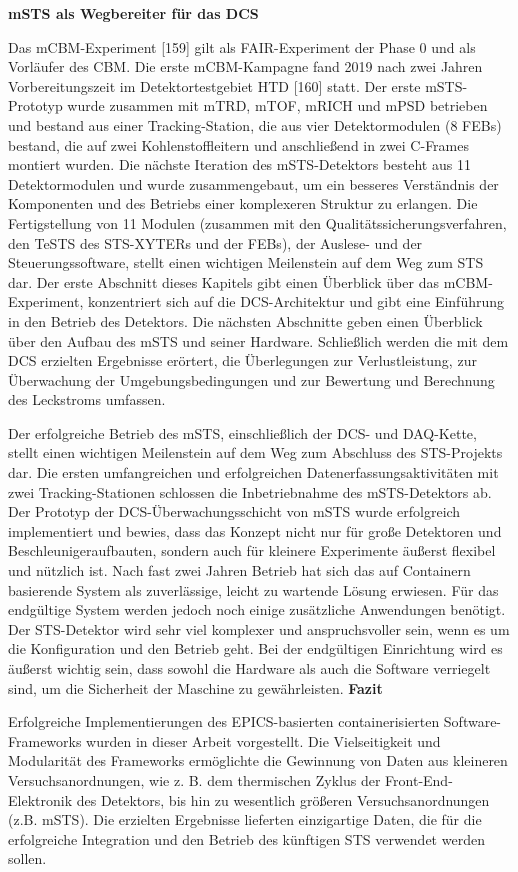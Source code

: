 \bigbreak
\textbf{\gls{mSTS} als Wegbereiter für das DCS}
\bigbreak

Das \gls{mCBM}-Experiment [159] gilt als FAIR-Experiment der Phase 0 und als Vorläufer des CBM. Die erste \gls{mCBM}-Kampagne fand 2019 nach zwei Jahren Vorbereitungszeit im Detektortestgebiet HTD [160] statt. Der erste \gls{mSTS}-Prototyp wurde zusammen mit mTRD, mTOF, mRICH und mPSD betrieben und bestand aus einer Tracking-Station, die aus vier Detektormodulen (8 FEBs) bestand, die auf zwei Kohlenstoffleitern und anschließend in zwei C-Frames montiert wurden. Die nächste Iteration des \gls{mSTS}-Detektors besteht aus 11 Detektormodulen und wurde zusammengebaut, um ein besseres Verständnis der Komponenten und des Betriebs einer komplexeren Struktur zu erlangen. Die Fertigstellung von 11 Modulen (zusammen mit den Qualitätssicherungsverfahren, den Te\gls{STS} des \gls{STS}-XYTERs und der FEBs), der Auslese- und der Steuerungssoftware, stellt einen wichtigen Meilenstein auf dem Weg zum \gls{STS} dar. Der erste Abschnitt dieses Kapitels gibt einen Überblick über das \gls{mCBM}-Experiment, konzentriert sich auf die DCS-Architektur und gibt eine Einführung in den Betrieb des Detektors. Die nächsten Abschnitte geben einen Überblick über den Aufbau des \gls{mSTS} und seiner Hardware. Schließlich werden die mit dem DCS erzielten Ergebnisse erörtert, die Überlegungen zur Verlustleistung, zur Überwachung der Umgebungsbedingungen und zur Bewertung und Berechnung des Leckstroms umfassen.

Der erfolgreiche Betrieb des \gls{mSTS}, einschließlich der \gls{DCS}- und \gls{DAQ}-Kette, stellt einen wichtigen Meilenstein auf dem Weg zum Abschluss des \gls{STS}-Projekts dar. Die ersten umfangreichen und erfolgreichen Datenerfassungsaktivitäten mit zwei Tracking-Stationen schlossen die Inbetriebnahme des \gls{mSTS}-Detektors ab. Der Prototyp der \gls{DCS}-Überwachungsschicht von \gls{mSTS} wurde erfolgreich implementiert und bewies, dass das Konzept nicht nur für große Detektoren und Beschleunigeraufbauten, sondern auch für kleinere Experimente äußerst flexibel und nützlich ist. Nach fast zwei Jahren Betrieb hat sich das auf Containern basierende System als zuverlässige, leicht zu wartende Lösung erwiesen. Für das endgültige System werden jedoch noch einige zusätzliche Anwendungen benötigt. Der \gls{STS}-Detektor wird sehr viel komplexer und anspruchsvoller sein, wenn es um die Konfiguration und den Betrieb geht. Bei der endgültigen Einrichtung wird es äußerst wichtig sein, dass sowohl die Hardware als auch die Software verriegelt sind, um die Sicherheit der Maschine zu gewährleisten.
\bigbreak
\textbf{Fazit}
\bigbreak

Erfolgreiche Implementierungen des EPICS-basierten containerisierten Software-Frameworks wurden in dieser Arbeit vorgestellt. Die Vielseitigkeit und Modularität des Frameworks ermöglichte die Gewinnung von Daten aus kleineren Versuchsanordnungen, wie z. B. dem thermischen Zyklus der Front-End-Elektronik des Detektors, bis hin zu wesentlich größeren Versuchsanordnungen (z.B. \gls{mSTS}). Die erzielten Ergebnisse lieferten einzigartige Daten, die für die erfolgreiche Integration und den Betrieb des künftigen \gls{STS} verwendet werden sollen.

